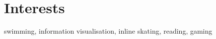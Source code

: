 \documentclass[]{friggeri-cv}
\begin{document}
%
%	
\section{Interests}
swimming, information visualisation, inline skating, reading, gaming
\end{document}
